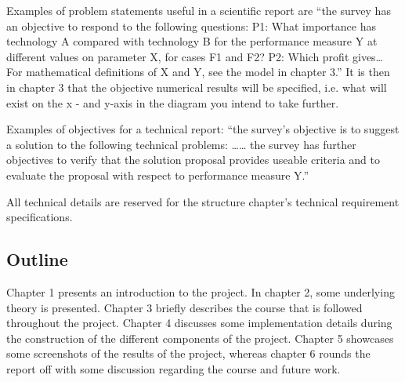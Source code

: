 Examples of problem statements useful in a scientific report are “the survey has an objective to respond to the following questions: P1: What importance has technology A compared with technology B for the performance measure Y at different values on parameter X, for cases F1 and F2? P2: Which profit gives… For mathematical definitions of X and Y, see the model in chapter 3.” It is then in chapter 3 that the objective numerical results will be specified, i.e. what will exist on the x - and y-axis in the diagram you intend to take further.

Examples of objectives for a technical report: “the survey's objective is to suggest a solution to the following technical problems: …… the survey has further objectives to verify that the solution proposal provides useable criteria and to evaluate the proposal with respect to performance measure Y.”

All technical details are reserved for the structure chapter's technical requirement specifications.
\fi

\subsection{Outline}
\label{ch:intro:outline}
Chapter 1 presents an introduction to the project. In chapter 2, some underlying theory is presented. Chapter 3 briefly describes the course that is followed throughout the project. Chapter 4 discusses some implementation details during the construction of the different components of the project. Chapter 5 showcases some screenshots of the results of the project, whereas chapter 6 rounds the report off with some discussion regarding the course and future work.
\iffalse
Briefly describe the report's outline. “Chapter 2 describes…”
\fi
